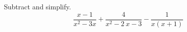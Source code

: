 \begin{exercise} Subtract and simplify.
	$$
	\frac{x-1}{x^2-3x}+\frac{4}{x^2-2\:x-3}-\frac{1}{x\left(x+1\right)}
	$$
\end{exercise}


\vfill
\begin{center} \hfill
\end{center}